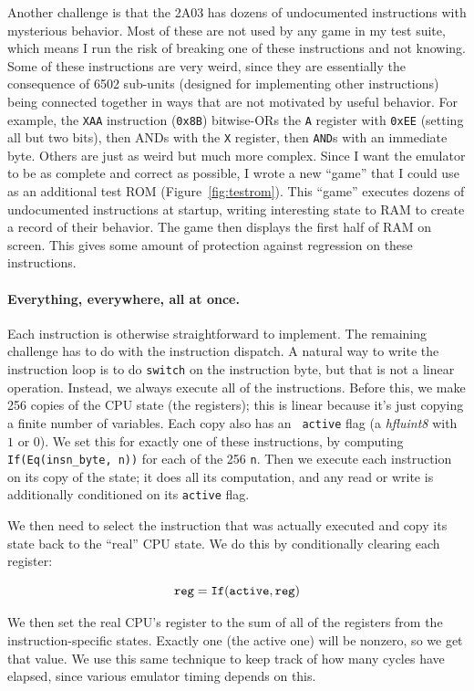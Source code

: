 \documentclass[twocolumn]{article}
\begin{document}
Another challenge is that the 2A03 has dozens of undocumented
instructions with mysterious behavior. Most of these are not used by
any game in my test suite, which means I run the risk of breaking one
of these instructions and not knowing. Some of these instructions are
very weird, since they are essentially the consequence of 6502
sub-units (designed for implementing other instructions) being
connected together in ways that are not motivated by useful behavior.
For example, the {\tt XAA} instruction ({\tt 0x8B}) bitwise-ORs the
{\tt A} register with {\tt 0xEE} (setting all but two bits), then ANDs
with the {\tt X} register, then {\tt AND}s with an immediate byte.
Others are just as weird but much more complex. Since I want the
emulator to be as complete and correct as possible, I wrote a new
``game'' that I could use as an additional test ROM
(Figure~\ref{fig:testrom}). This ``game'' executes dozens of
undocumented instructions at startup, writing interesting state to RAM
to create a record of their behavior. The game then displays the first
half of RAM on screen. This gives some amount of protection against
regression on these instructions.

\paragraph{Everything, everywhere, all at once.}
Each instruction is otherwise straightforward to implement. The
remaining challenge has to do with the instruction dispatch. A natural
way to write the instruction loop is to do {\tt switch} on the
instruction byte, but that is not a linear operation. Instead, we
always execute all of the instructions. Before this, we make 256
copies of the CPU state (the registers); this is linear because it's
just copying a finite number of variables. Each copy also has an {\tt
  active} flag (a {\it hfluint8} with $1$ or $0$). We set this for
exactly one of these instructions, by computing
\verb+If(Eq(insn_byte, n))+ for each of the 256 {\tt n}. Then we
execute each instruction on its copy of the state; it does all its
computation, and any read or write is additionally conditioned on
its {\tt active} flag.

We then need to select the instruction that was actually executed
and copy its state back to the ``real'' CPU state. We do this by
conditionally clearing each register:

$${\tt reg = If(active, reg)}$$

We then set the real CPU's register to the sum of all of the registers
from the instruction-specific states. Exactly one (the active one)
will be nonzero, so we get that value. We use this same technique to
keep track of how many cycles have elapsed, since various emulator
timing depends on this.
\end{document}
